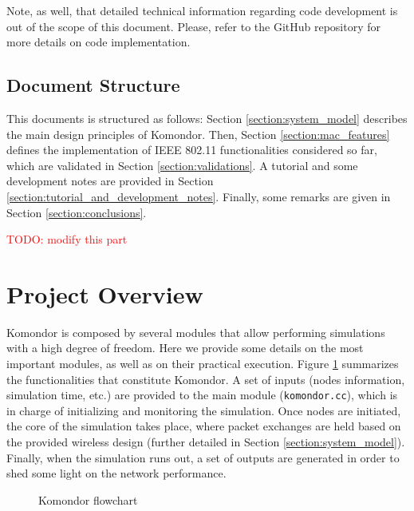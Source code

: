 \documentclass[a4paper]{article}
\begin{document}
	Note, as well, that detailed technical information regarding code development is out of the scope of this document. Please, refer to the GitHub repository for more details on code implementation.
	
	\subsection{Document Structure}
	\label{section:structure}
	This documents is structured as follows: Section \ref{section:system_model} describes the main design principles of Komondor. Then, Section \ref{section:mac_features} defines the implementation of IEEE 802.11 functionalities considered so far, which are validated in Section \ref{section:validations}. A tutorial and some development notes are provided in Section \ref{section:tutorial_and_development_notes}. Finally, some remarks are given in Section \ref{section:conclusions}.
	
	\textcolor{red}{TODO: modify this part}
	
\section{Project Overview}
\label{section:project_overview}

Komondor is composed by several modules that allow performing simulations with a high degree of freedom. Here we provide some details on the most important modules, as well as on their practical execution. Figure \ref{fig:komondor_flowchart} summarizes the functionalities that constitute Komondor. A set of inputs (nodes information, simulation time, etc.) are provided to the main module (\texttt{komondor.cc}), which is in charge of initializing and monitoring the simulation. Once nodes are initiated, the core of the simulation takes place, where packet exchanges are held based on the provided wireless design (further detailed in Section \ref{section:system_model}). Finally, when the simulation runs out, a set of outputs are generated in order to shed some light on the network performance.
\begin{figure}[h!]
	\centering
	\caption{Komondor flowchart}
	\label{fig:komondor_flowchart}
\end{figure}		

\end{document}
